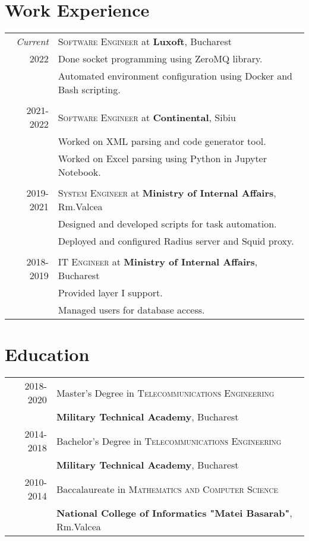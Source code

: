 \documentclass[a4paper,10pt]{article}
\begin{document}
\section{Work Experience}
\begin{tabular}{r|p{11cm}}

\emph{Current}
&\textsc{Software Engineer} at \textbf{Luxoft}, Bucharest\\
\textsc{2022}
&\footnotesize{Done socket programming using ZeroMQ library.}\\
&\footnotesize{Automated environment configuration using Docker and Bash scripting.}\\
\multicolumn{2}{c}{}\\
\textsc{2021-2022}
&\textsc{Software Engineer} at \textbf{Continental}, Sibiu\\
&\footnotesize{Worked on XML parsing and code generator tool.}\\
&\footnotesize{Worked on Excel parsing using Python in Jupyter Notebook.}\\
\multicolumn{2}{c}{}\\
\textsc{2019-2021} 
  &\textsc{System Engineer} at \textbf{Ministry of Internal Affairs}, Rm.Valcea\\
&\footnotesize{
  Designed and developed scripts for task automation.}\\
&\footnotesize{
  Deployed and configured Radius server and Squid proxy.}\\
\multicolumn{2}{c}{}\\
\textsc{2018-2019} 
&\textsc{IT Engineer} at \textbf{Ministry of Internal Affairs}, Bucharest\\
&\footnotesize{Provided layer I support.}\\
&\footnotesize{Managed users for database access.}\\
\end{tabular}

\section{Education}
\begin{tabular}{rl}
\textsc{2018-2020}&Master's Degree in 
  \textsc{Telecommunications Engineering}\\
  &\textbf{Military Technical Academy}, Bucharest\\
\textsc{2014-2018}&Bachelor's Degree in
  \textsc{Telecommunications Engineering}\\
  &\textbf{Military Technical Academy}, Bucharest\\
\textsc{2010-2014}&Baccalaureate in 
  \textsc{Mathematics and Computer Science}\\
  &\textbf{National College of Informatics "Matei Basarab"}, Rm.Valcea\\
\end{tabular}
\end{document}
